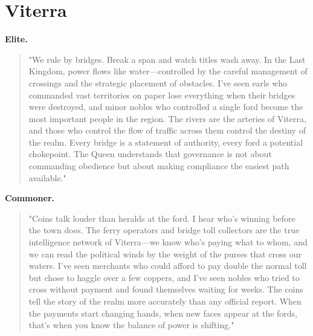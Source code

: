 \section*{Viterra}
\textbf{Elite.}
\begin{quote}
"We rule by bridges. Break a span and watch titles wash away. In the Last Kingdom, power flows like water—controlled by the careful management of crossings and the strategic placement of obstacles. I've seen earls who commanded vast territories on paper lose everything when their bridges were destroyed, and minor nobles who controlled a single ford become the most important people in the region. The rivers are the arteries of Viterra, and those who control the flow of traffic across them control the destiny of the realm. Every bridge is a statement of authority, every ford a potential chokepoint. The Queen understands that governance is not about commanding obedience but about making compliance the easiest path available."
\end{quote}
\textbf{Commoner.}
\begin{quote}
"Coins talk louder than heralds at the ford. I hear who's winning before the town does. The ferry operators and bridge toll collectors are the true intelligence network of Viterra—we know who's paying what to whom, and we can read the political winds by the weight of the purses that cross our waters. I've seen merchants who could afford to pay double the normal toll but chose to haggle over a few coppers, and I've seen nobles who tried to cross without payment and found themselves waiting for weeks. The coins tell the story of the realm more accurately than any official report. When the payments start changing hands, when new faces appear at the fords, that's when you know the balance of power is shifting."
\end{quote}

